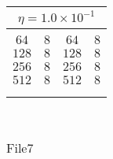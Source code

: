 \begin{center}
\begin{table}[]
\begin{center}
\begin{tabular}{@{}cc|cc@{}}
\multicolumn{4}{c}{$\eta = 1.0\times 10^{-1}$} \\[5pt]
\hline\\[-11pt]
$64$ & $8$ & $64$ & $8$ \\ [1pt]
$128$ & $8$ & $128$ & $8$ \\ [1pt]
$256$ & $8$ & $256$ & $8$ \\ [1pt]
$512$ & $8$ & $512$ & $8$ \\ [1pt]
\hline\\[-11pt]

\hline\\[-8pt]
\end{tabular}\\[5pt]
\end{center}
\normalsize
\end{table}

\begin{table}[]
  \small
\begin{center} 
\caption{File7}\label{tab:lse2}

\begin{tabular}{@{}cc|cc@{}}


\end{tabular}
\end{center}
\end{table}
\end{center}
